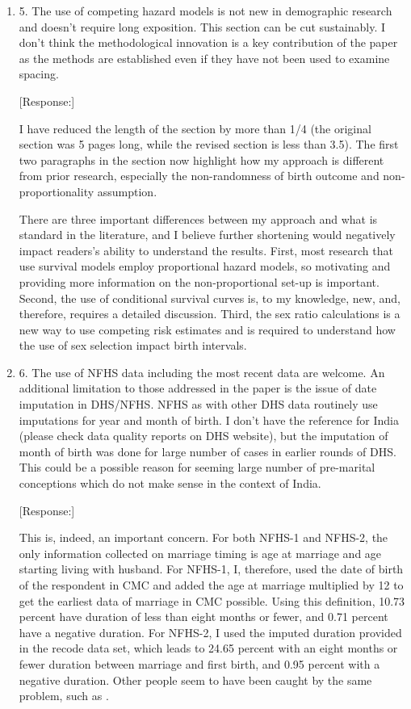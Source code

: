 \documentclass[letterpaper,12pt]{article}
\begin{document}
\begin{enumerate}
\item 5. The use of competing hazard models is not new in demographic research
and doesn’t require long exposition. This section can be cut
sustainably. I don’t think the methodological innovation is a key
contribution of the paper as the methods are established even if they
have not been used to examine spacing.

[Response:]

I have reduced the length of the section by more than 1/4 (the original section was 5
pages long, while the revised section is less than 3.5).
The first two paragraphs in the section now highlight how my approach is different from
prior research, especially the non-randomness of birth outcome and non-proportionality
assumption.

There are three important differences between my approach and what is standard
in the literature, and I believe further shortening would negatively impact readers's
ability to understand the results.
First, most research that use survival models employ proportional hazard models, so 
motivating and providing more information on the non-proportional set-up is important.
Second, the use of conditional survival curves is, to my knowledge, new, and, therefore,
requires a detailed discussion.
Third, the sex ratio calculations is a new way to use competing risk estimates and is 
required to understand how the use of sex selection impact birth intervals.


\item 6. The use of NFHS data including the most recent data are welcome. An
additional limitation to those addressed in the paper is the issue of
date imputation in DHS/NFHS. NFHS as with other DHS data routinely use
imputations for year and month of birth. I don’t have the reference for
India (please check data quality reports on DHS website), but the
imputation of month of birth was done for large number of cases in
earlier rounds of DHS. This could be a possible reason for seeming large
number of pre-marital conceptions which do not make sense in the context
of India.

[Response:]

This is, indeed, an important concern.
For both NFHS-1 and NFHS-2, the only information collected on marriage timing is age at 
marriage and age starting living with husband.
For NFHS-1, I, therefore, used the date of birth of the respondent in CMC and added the 
age at marriage multiplied by 12 to get the earliest data of marriage in CMC possible.
Using this definition, 10.73 percent have duration of less than eight months or fewer, and
0.71 percent have a negative duration.
For NFHS-2, I used the imputed duration provided in the recode data set, which leads to 
24.65 percent with an eight months or fewer duration between marriage and first birth, 
and 0.95 percent with a negative duration.
Other people seem to have been caught by the same problem, such as \citet{Padmadas2004}.


\end{enumerate}
\end{document}
